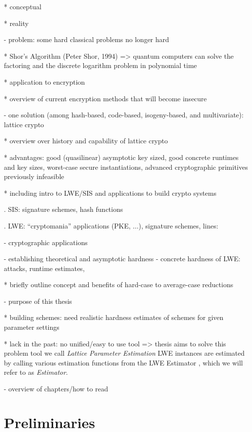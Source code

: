 \documentclass[
  a4paper,  %
  twoside,  %
  bibliography=totoc,
  headsepline,
  cleardoublepage=empty,
  parskip=half,
  draft=false
]{scrbook}
\begin{document}
  * conceptual

  * reality


- problem: some hard classical problems no longer hard

  * Shor's Algorithm (Peter Shor, 1994) %
    => quantum computers can solve the factoring and the discrete logarithm problem in polynomial time

  * application to encryption

  * overview of current encryption methods that will become insecure


- one solution (among hash-based, code-based, isogeny-based, and multivariate): lattice crypto

  * overview over history and capability of lattice crypto

  * advantages: good (quasilinear) asymptotic key sized, good concrete runtimes and key sizes, worst-case secure instantiations, advanced cryptographic primitives previously infeasible

  * including intro to LWE/SIS and applications to build crypto systems

    . SIS: signature schemes, hash functions

    . LWE: ``cryptomania'' applications (PKE, ...), signature schemes, lines:

      - cryptographic applications

      - establishing theoretical and asymptotic hardness \cite{Reg05} %
        \cite{BLPRS13, MP13} 
      - concrete hardness of LWE: attacks, runtime estimates, 

  * briefly outline concept and benefits of hard-case to average-case reductions


- purpose of this thesis

  * building schemes: need realistic hardness estimates of schemes for given parameter settings

  * lack in the past: no unified/easy to use tool => thesis aims to solve this problem
    tool we call \textit{Lattice Parameter Estimation} 
    LWE instances are estimated by calling various estimation functions from the LWE Estimator \cite{APS15}, which we will refer to as \textit{Estimator}.


- overview of chapters/how to read



\chapter{Preliminaries} \label{chap:Preliminaries}
\end{document}
